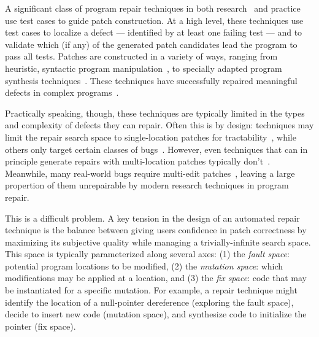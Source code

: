 \documentclass[10pt, conference]{IEEEtran}
\begin{document}
A significant class of program repair techniques in both
research~\cite{genprog,angelix,Le17,Xuan17,arja-journal,prapr,saha2019harnessing,astor}
and practice~\cite{sapfix} use test
cases to guide patch construction. At a high level, these techniques use test cases
to localize a defect --- identified by at least one failing test --- and to
validate which (if any) of the generated patch candidates lead
the program to pass all tests.
Patches are constructed in a variety of ways, ranging from heuristic, syntactic
program manipulation~\cite{par,genprog,rsrepair,ae,prophet,hdrepair,arja-journal,confix,saha2019harnessing},
to specially adapted program synthesis 
techniques~\cite{Konighofer11,Konighofer12,semfix,DeMarco14,angelix,sosrepair,Xuan17}. 
These techniques have successfully
repaired meaningful defects in complex
programs~\cite{angelix,genprog-eight-dollars,sapfix,durieux-repair-them-all}.

Practically speaking, though, these techniques are typically limited in the types and
complexity of defects they can repair. Often this is by design: techniques may
limit the repair search space to single-location patches for
tractability~\cite{rsrepair,ae,hdrepair,capgen}, while others only target certain
classes of bugs~\cite{Xuan17,sapfix,DeMarco14,par}. However, even techniques
that can in principle generate repairs with multi-location patches typically
don't~\cite{patch-correctness}.
%
Meanwhile, many real-world bugs require multi-edit patches~\cite{d4j-dissection,zhong2015}, leaving a large
propertion of them  unrepairable by modern
research techniques in program repair.  

This is a difficult problem.
A key tension in the design of an automated repair technique is the balance
between giving users confidence in patch correctness by maximizing its
subjective quality while managing a trivially-infinite search space. This space
is typically parameterized along several axes: (1) the \emph{fault space}:
potential program locations to be modified, (2) the \emph{mutation space}: which
modifications may be applied at a location, and (3) the \emph{fix space}: code
that may be instantiated for a specific mutation. For example, a repair
technique might identify the location of a null-pointer dereference (exploring
the fault space), decide to insert new code (mutation space), and synthesize
code to initialize the pointer (fix space). 
\end{document}

